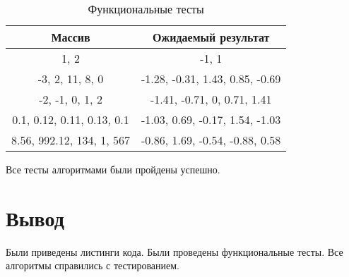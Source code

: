 \FloatBarrier
\begin{table}[h]
		\caption{Функциональные тесты}
		\label{tabular:functional_test}
		\begin{tabular}{| c | c |}
			\hline
		Массив & Ожидаемый результат \\ \hline
		1, 2 & -1, 1 \\
		\hline
		-3, 2, 11, 8, 0
		&
		-1.28, -0.31, 1.43, 0.85, -0.69 \\
		\hline
		-2, -1, 0, 1, 2 & 
		-1.41, -0.71, 0, 0.71, 1.41\\
		\hline
		0.1, 0.12, 0.11, 0.13, 0.1  &
		-1.03, 0.69, -0.17, 1.54, -1.03 \\
		\hline
		8.56, 992.12, 134, 1, 567 &
		-0.86, 1.69, -0.54, -0.88, 0.58
		\\
		\hline
		\end{tabular}
\end{table}
\FloatBarrier

Все тесты алгоритмами были пройдены успешно.

\section{Вывод}
Были приведены листинги кода.
Были проведены функциональные тесты.
Все алгоритмы справились с тестированием.